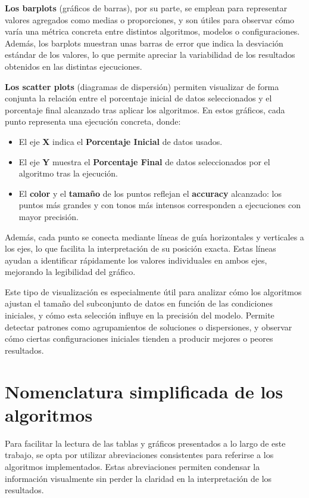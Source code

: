 \textbf{Los barplots} (gráficos de barras), por su parte, se emplean para representar valores agregados como medias o proporciones,
y son útiles para observar cómo varía una métrica concreta entre distintos algoritmos, modelos o configuraciones.
Además, los barplots muestran unas barras de error que indica la desviación estándar de los valores,
lo que permite apreciar la variabilidad de los resultados obtenidos en las distintas ejecuciones.

\textbf{Los scatter plots} (diagramas de dispersión) permiten visualizar de forma conjunta la relación entre el
porcentaje inicial de datos seleccionados y el porcentaje final alcanzado tras aplicar los algoritmos.
En estos gráficos, cada punto representa una ejecución concreta, donde:

\begin{itemize}
    \item El eje \textbf{X} indica el \textbf{Porcentaje Inicial} de datos usados.
    \item El eje \textbf{Y} muestra el \textbf{Porcentaje Final} de datos seleccionados por el algoritmo tras la ejecución.
    \item El \textbf{color} y el \textbf{tamaño} de los puntos reflejan el \textbf{accuracy} alcanzado: los puntos más grandes
          y con tonos más intensos corresponden a ejecuciones con mayor precisión.
\end{itemize}

Además, cada punto se conecta mediante líneas de guía horizontales y verticales a los ejes, lo que facilita la interpretación de su posición exacta.
Estas líneas ayudan a identificar rápidamente los valores individuales en ambos ejes, mejorando la legibilidad del gráfico.

Este tipo de visualización es especialmente útil para analizar cómo los algoritmos ajustan el tamaño del subconjunto de datos en función de las condiciones iniciales,
y cómo esta selección influye en la precisión del modelo.
Permite detectar patrones como agrupamientos de soluciones o dispersiones, y observar cómo ciertas configuraciones iniciales tienden a producir mejores o peores resultados.


\section{Nomenclatura simplificada de los algoritmos}\label{subsec:nomenclatura-algoritmos}
Para facilitar la lectura de las tablas y gráficos presentados a lo largo de este trabajo,
se opta por utilizar abreviaciones consistentes para referirse a los algoritmos implementados.
Estas abreviaciones permiten condensar la información visualmente sin perder la claridad en la interpretación de los resultados.

